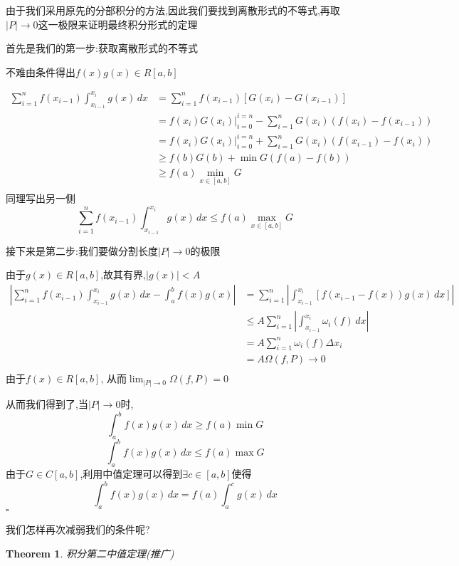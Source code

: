 \documentclass[11pt,hyperref,a4paper,UTF8]{ctexart}
\newtheorem{theorem}{Theorem}[subsection]
\newenvironment{cproof}{%
\heiti{证明}\kaishu
}{%
  \hfill $\square$
  \par\bigskip
}
\newcommand{\parameter}[1]{\left(#1\right)}
\newcommand{\bracket}[1]{\left[#1\right]}
\begin{document}
\begin{CJK}{UTF8}{gkai}
\begin{cproof}
  由于我们采用原先的分部积分的方法,因此我们要找到离散形式的不等式,再取$|P| \to 0$这一极限来证明最终积分形式的定理

  首先是我们的第一步:获取离散形式的不等式

  不难由条件得出$f(x)g(x)\in R[a,b]$

  \[\begin{aligned}
  \sum_{i = 1}^{n} f(x_{i - 1}) \int_{x_{i - 1}}^{x_i} g(x)\, dx &= \sum_{i
  =1}^{n} f(x_{i - 1})\bracket{G(x_i) - G(x_{i - 1})}\\
  &= f(x_i)G(x_i)|_{i = 0}^{i = n} - \sum_{i = 1}^{n} G(x_i) \parameter{f(x_i) - f(x_{i - 1})}\\
  &= f(x_i)G(x_i)|_{i = 0}^{i = n} + \sum_{i = 1}^{n} G(x_i) \parameter{f(x_{i - 1}) - f(x_{i})}\\
  &\geq f(b)G(b) + \min G (f(a) - f(b))\\
  &\geq f(a) \min_{x \in [a,b]} G\\
  \end{aligned}\]
  同理写出另一侧
  \[\sum_{i = 1}^{n} f(x_{i - 1}) \int_{x_{i - 1}}^{x_i} g(x)\, dx \leq f(a) \max_{x \in [a,b]} G\]

  接下来是第二步:我们要做分割长度$|P|\to 0$的极限

  由于$g(x)\in R[a,b]$,故其有界,$|g(x)| < A$
  \[\begin{aligned}
    \left|\sum_{i = 1}^{n} f(x_{i - 1}) \int_{x_{i - 1}}^{x_i} g(x)\, dx  -\int_{a}^{b}f(x)g(x)\right| &= \sum_{i = 1}^{n}\left| \int_{x_{i - 1}}^{x_i} \bracket{f(x_{i - 1} - f(x)) g(x) \, dx} \right|\\
    &\leq A \sum_{i = 1}^{n} \left|\int_{x_{i - 1}}^{x_i} \omega_i(f) \, dx \right|\\
    &= A \sum_{i = 1}^{n} \omega_{i}(f) \Delta x_i\\
    &= A \Omega(f,P) \to 0\\
  \end{aligned}\]
  由于$f(x) \in R[a,b]$, 从而$\lim_{|P|\to 0} \Omega(f,P) = 0$

  从而我们得到了,当$|P| \to 0$时,
  \[\int_{a}^{b}f(x)g(x)\, dx \geq f(a) \min G\]
  \[\int_{a}^{b}f(x)g(x)\, dx \leq f(a) \max G\]
  由于$G\in C[a,b]$,利用中值定理可以得到$\exists c \in [a,b]$使得
  \[\int_{a}^{b} f(x)g(x) \, dx = f(a) \int_{a}^{c}g(x)\, dx\]
\end{cproof}

我们怎样再次减弱我们的条件呢?

\begin{theorem}
  积分第二中值定理(推广)\\


\end{theorem}
\end{CJK}
\end{document}
